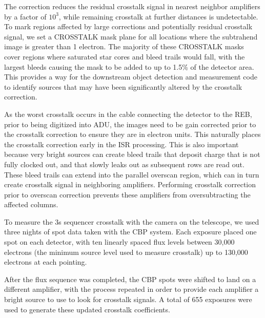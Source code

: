 The correction reduces the residual crosstalk signal in nearest neighbor amplifiers by a factor of $10^3$, while remaining crosstalk at further distances is undetectable.
To mark regions affected by large corrections and potentially residual crosstalk signal, we set a CROSSTALK mask plane for all locations where the subtrahend image is greater than 1 electron.
The majority of these CROSSTALK masks cover regions where saturated star cores and bleed trails would fall, with the largest bleeds causing the mask to be added to up to 1.5\% of the detector area.
This provides a way for the downstream object detection and measurement code to identify sources that may have been significantly altered by the crosstalk correction.

As the worst crosstalk occurs in the cable connecting the detector to the REB, prior to being digitized into ADU, the images need to be gain corrected prior to the crosstalk correction to ensure they are in electron units.
This naturally places the crosstalk correction early in the ISR processing. This is also important because very bright sources can create bleed trails that deposit charge that is not fully clocked out, and that slowly leaks out as subsequent rows are read out.
These bleed trails can extend into the parallel overscan region, which can in turn create crosstalk signal in neighboring amplifiers.
Performing crosstalk correction prior to overscan correction prevents these amplifiers from oversubtracting the affected columns.

To measure the 3s sequencer crosstalk with the camera on the telescope, we used three nights of spot data taken with the CBP system.
Each exposure placed one spot on each detector, with ten linearly spaced flux levels between 30,000 electrons (the minimum source level used to measure crosstalk) up to 130,000 electrons at each pointing.

After the flux sequence was completed, the CBP spots were shifted to land on a different amplifier, with the process repeated in order to provide each amplifier a bright source to use to look for crosstalk signals.
A total of 655 exposures were used to generate these updated crosstalk coefficients.

